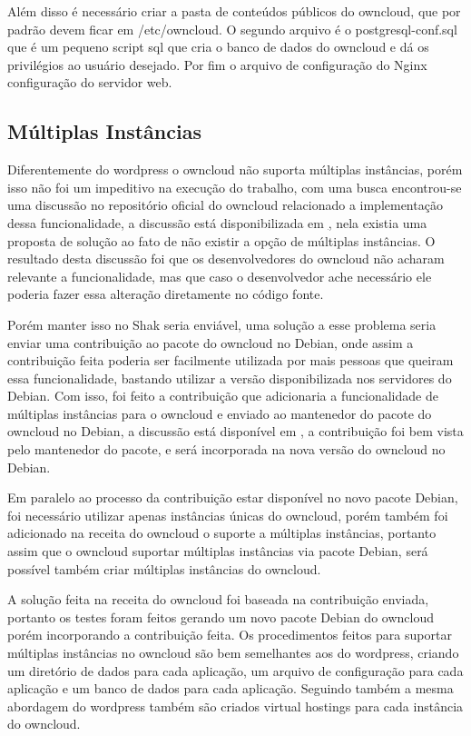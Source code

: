 Além disso é necessário criar a pasta de conteúdos públicos do owncloud, que por
padrão devem ficar em /etc/owncloud. O segundo arquivo é o postgresql-conf.sql
que é um pequeno script sql que cria o banco de dados do owncloud e dá os
privilégios ao usuário desejado. Por fim o arquivo de configuração do Nginx
configuração do servidor web.

\subsection{Múltiplas Instâncias}

Diferentemente do wordpress o owncloud não suporta múltiplas instâncias, porém isso
não foi um impeditivo na execução do trabalho, com uma busca encontrou-se uma discussão no repositório
oficial do owncloud relacionado a implementação dessa funcionalidade, a discussão está
disponibilizada em \href{https://github.com/owncloud/core/pull/16424}, nela existia
uma proposta de solução ao fato de não existir a opção de múltiplas instâncias. O
resultado desta discussão foi que os desenvolvedores do owncloud não acharam relevante
a funcionalidade, mas que caso o desenvolvedor ache necessário ele poderia fazer essa
alteração diretamente no código fonte.

Porém manter isso no Shak seria enviável, uma solução a esse problema seria enviar
uma contribuição ao pacote do owncloud no Debian, onde assim a contribuição feita
poderia ser facilmente utilizada por mais pessoas que queiram essa funcionalidade,
bastando utilizar a versão disponibilizada nos servidores do Debian. Com isso, foi
feito a contribuição que adicionaria a funcionalidade de múltiplas instâncias para
o owncloud e enviado ao mantenedor do pacote do owncloud no Debian,
a discussão está disponível em \href{https://bugs.debian.org/cgi-bin/bugreport.cgi?bug=789726},
a contribuição foi bem vista pelo mantenedor do pacote, e será incorporada na nova
versão do owncloud no Debian.

Em paralelo ao processo da contribuição estar disponível no novo pacote Debian,
foi necessário utilizar apenas instâncias únicas do owncloud, porém também foi
adicionado na receita do owncloud o suporte a múltiplas instâncias, portanto
assim que o owncloud suportar múltiplas instâncias via pacote Debian, será possível
também criar múltiplas instâncias do owncloud.

A solução feita na receita do owncloud foi baseada na contribuição enviada, portanto
os testes foram feitos gerando um novo pacote Debian do owncloud porém incorporando
a contribuição feita. Os procedimentos feitos para suportar múltiplas instâncias
no owncloud são bem semelhantes aos do wordpress, criando um diretório de dados
para cada aplicação, um arquivo de configuração para cada aplicação e um banco de
dados para cada aplicação. Seguindo também a mesma abordagem do wordpress também
são criados virtual hostings para cada instância do owncloud.

